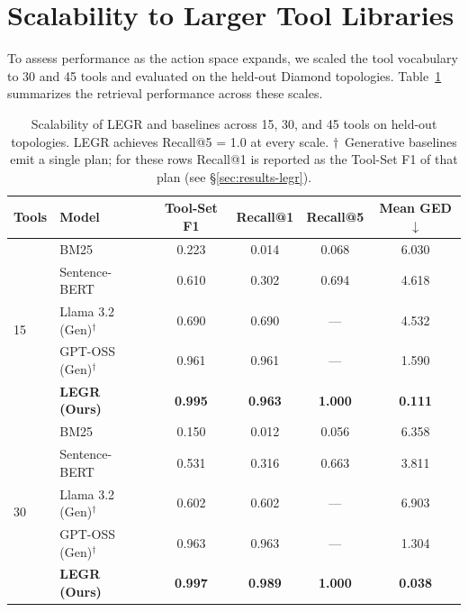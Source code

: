 \documentclass{article}
\begin{document}
\nocite{*}

\medskip
\small




\clearpage
\appendix

\section{Scalability to Larger Tool Libraries}

To assess performance as the action space expands, we scaled the tool vocabulary to 30 and 45 tools and evaluated on the held-out Diamond topologies. Table~\ref{tab:scalability} summarizes the retrieval performance across these scales.

\begin{table}[h]
\caption{Scalability of LEGR and baselines across 15, 30, and 45 tools on held-out topologies. LEGR achieves Recall@5 = 1.0 at every scale. $\dagger$~Generative baselines emit a single plan; for these rows Recall@1 is reported as the Tool-Set F1 of that plan (see \S\ref{sec:results-legr}).}
\label{tab:scalability}
\centering
\small
\begin{tabular}{@{}llcccc@{}}
\toprule
\textbf{Tools} & \textbf{Model} & \textbf{Tool-Set F1} & \textbf{Recall@1} & \textbf{Recall@5} & \textbf{Mean GED $\downarrow$} \\
\midrule
\multirow{5}{*}{15}
  & BM25                          & 0.223 & 0.014 & 0.068 & 6.030 \\
  & Sentence-BERT                        & 0.610 & 0.302 & 0.694 & 4.618 \\
  & Llama 3.2 (Gen)$^\dagger$     & 0.690 & 0.690 & ---     & 4.532 \\
  & GPT-OSS (Gen)$^\dagger$       & 0.961 & 0.961 & ---     & 1.590 \\
  & \textbf{LEGR (Ours)}          & \textbf{0.995} & \textbf{0.963} & \textbf{1.000} & \textbf{0.111} \\
\midrule
\multirow{5}{*}{30}
  & BM25                          & 0.150 & 0.012 & 0.056 & 6.358 \\
  & Sentence-BERT                        & 0.531 & 0.316 & 0.663 & 3.811 \\
  & Llama 3.2 (Gen)$^\dagger$     & 0.602 & 0.602 & ---     & 6.903 \\
  & GPT-OSS (Gen)$^\dagger$       & 0.963 & 0.963 & ---     & 1.304 \\
  & \textbf{LEGR (Ours)}          & \textbf{0.997} & \textbf{0.989} & \textbf{1.000} & \textbf{0.038} \\

\end{tabular}
\end{table}
\end{document}
